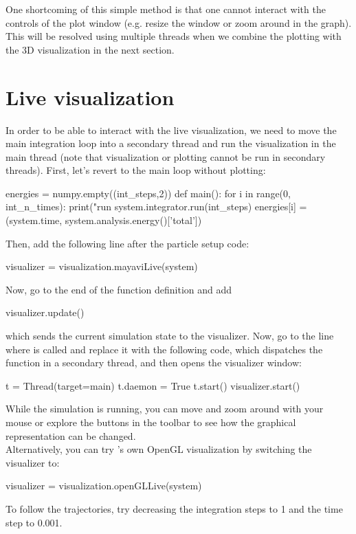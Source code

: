 \documentclass[
paper=a4,                       %
fontsize=11pt,                  %
twoside,                        %
footsepline,                    %
headsepline,                    %
headinclude=false,              %
footinclude=false,              %
pagesize,                       %
]{scrartcl}
\begin{document}
\noindent One shortcoming of this simple method is that one cannot interact with the controls of the plot window (e.g. resize the window or zoom around in the graph).
This will be resolved using multiple threads when we combine the plotting with the 3D visualization in the next section.

\section{Live visualization}
\label{vis}

In order to be able to interact with the live visualization, we need to move the main integration loop into a secondary thread and run the visualization in the main thread (note that visualization or plotting cannot be run in secondary threads). First, let's revert to the main loop without plotting:
\begin{pypresso}
energies = numpy.empty((int_steps,2))
def main():
    for i in range(0, int_n_times):
        print("run %
        system.integrator.run(int_steps)
        energies[i] = (system.time, system.analysis.energy()['total'])
\end{pypresso}

Then, add the following line after the particle setup code:
\begin{pypresso}
visualizer = visualization.mayaviLive(system)
\end{pypresso}
Now, go to the end of the  function definition and add
\begin{pypresso}
visualizer.update()
\end{pypresso}
which sends the current simulation state to the visualizer.
Now, go to the line where  is called and replace it with the following code, which dispatches the function in a secondary thread, and then opens the visualizer window:
\begin{pypresso}
t = Thread(target=main)
t.daemon = True
t.start()
visualizer.start()
\end{pypresso}
While the simulation is running, you can move and zoom around with your mouse or explore the buttons in the toolbar to see how the graphical representation can be changed.\\

\noindent Alternatively, you can try \es's own OpenGL visualization by switching the visualizer to:
\begin{pypresso}
visualizer = visualization.openGLLive(system)
\end{pypresso}
To follow the trajectories, try decreasing the integration steps to 1 and the time step to 0.001. 
\end{document}
